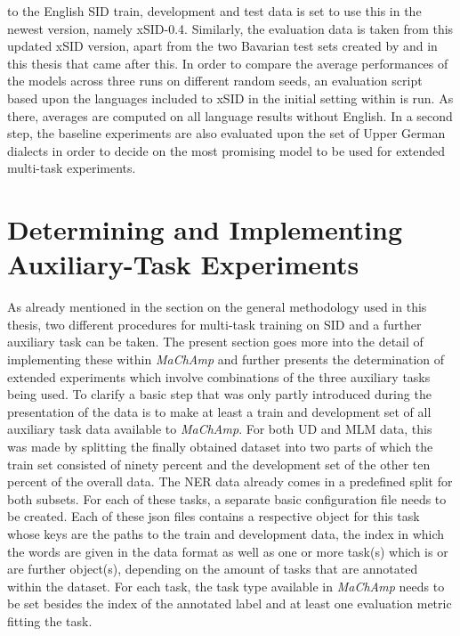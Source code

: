 \documentclass[11pt,a4paper,twoside,openright]{scrbook}
\begin{document}
to the English SID train, development and test data is set to use this in the newest version, namely xSID-0.4. Similarly, the evaluation data is taken from this updated xSID version, apart from the two Bavarian test sets created by \citet{winkler-etal-2024-slot-intent} and in this thesis that came after this. In order to compare the average performances of the models across three runs on different random seeds, an evaluation script based upon the languages included to xSID in the initial setting within \citep{van-der-goot-etal-2021-masked} is run. As there, averages are computed on all language results without English. In a second step, the baseline experiments are also evaluated upon the set of Upper German dialects in order to decide on the most promising model to be used for extended multi-task experiments.







\section{Determining and Implementing Auxiliary-Task Experiments}

As already mentioned in the section on the general methodology used in this thesis, two different procedures for multi-task training on SID and a further auxiliary task can be taken. The present section goes more into the detail of implementing these within \textit{MaChAmp} and further presents the determination of extended experiments which involve combinations of the three auxiliary tasks being used. To clarify a basic step that was only partly introduced during the presentation of the data is to make at least a train and development set of all auxiliary task data available to \textit{MaChAmp}. For both UD and MLM data, this was made by splitting the finally obtained dataset into two parts of which the train set consisted of ninety percent and the development set of the other ten percent of the overall data. The NER data already comes in a predefined split for both subsets. For each of these tasks, a separate basic configuration file needs to be created. Each of these json files contains a respective object for this task whose keys are the paths to the train and development data, the index in which the words are given in the data format as well as one or more task(s) which is or are further object(s), depending on the amount of tasks that are annotated within the dataset. For each task, the task type available in \textit{MaChAmp} needs to be set besides the index of the annotated label and at least one evaluation metric fitting the task. 
\end{document}
